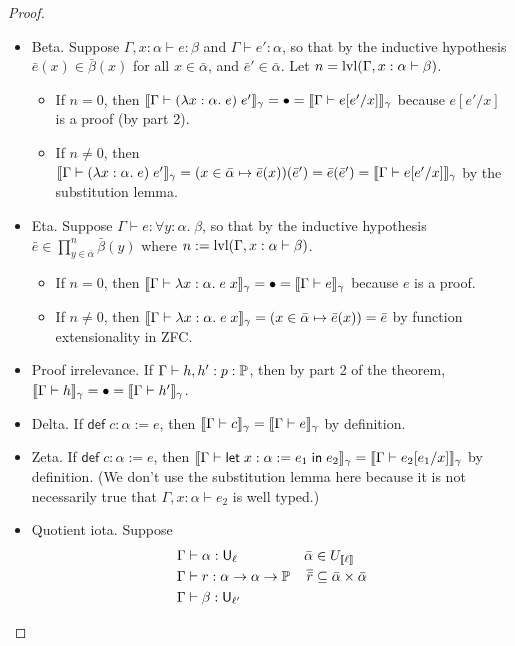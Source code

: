 \begin{proof}
\begin{itemize}
\item Beta. Suppose $\Gamma,x:\alpha\vdash e:\beta$ and $\Gamma\vdash e':\alpha$, so that by the inductive hypothesis $\bar e(x)\in\bar\beta(x)$ for all $x\in\bar\alpha$, and $\bar e'\in\bar\alpha$. Let $n=\lvl(\Gamma,x:\alpha\vdash\beta)$.
\begin{itemize}
\item If $n=0$, then $\scott{\Gamma\vdash(\lambda x:\alpha.\;e)\;e'}_\gamma=\bullet=\scott{\Gamma\vdash e[e'/x]}_\gamma$ because $e[e'/x]$ is a proof (by part 2).
\item If $n\ne 0$, then $\scott{\Gamma\vdash(\lambda x:\alpha.\;e)\;e'}_\gamma=(x\in\bar\alpha\mapsto\bar e(x))(\bar e')=\bar e(\bar e')=\scott{\Gamma\vdash e[e'/x]}_\gamma$ by the substitution lemma.
\end{itemize}
\item Eta. Suppose $\Gamma\vdash e:\forall y:\alpha.\;\beta$, so that by the inductive hypothesis $\bar e\in\prod^n_{y\in\bar\alpha}\bar\beta(y)$ where $n:=\lvl(\Gamma,x:\alpha\vdash\beta)$.
\begin{itemize}
\item If $n=0$, then $\scott{\Gamma\vdash \lambda x:\alpha.\;e\;x}_\gamma=\bullet=\scott{\Gamma\vdash e}_\gamma$ because $e$ is a proof.
\item If $n\ne 0$, then $\scott{\Gamma\vdash \lambda x:\alpha.\;e\;x}_\gamma=(x\in\bar\alpha\mapsto\bar e(x))=\bar e$ by function extensionality in ZFC.
\end{itemize}
\item Proof irrelevance. If $\Gamma\vdash h,h':p:\P$, then by part 2 of the theorem, $\scott{\Gamma\vdash h}_\gamma=\bullet=\scott{\Gamma\vdash h'}_\gamma$.
\item Delta. If $\mathsf{def}\;c:\alpha:=e$, then $\scott{\Gamma\vdash c}_\gamma=\scott{\Gamma\vdash e}_\gamma$ by definition.
\item Zeta. If $\mathsf{def}\;c:\alpha:=e$, then $\scott{\Gamma\vdash\elet{x:\alpha:=e_1}{e_2}}_\gamma=\scott{\Gamma\vdash e_2[e_1/x]}_\gamma$ by definition. (We don't use the substitution lemma here because it is not necessarily true that $\Gamma,x:\alpha\vdash e_2$ is well typed.)
\item Quotient iota. Suppose
\begin{align*}
\Gamma&\vdash\alpha:\U_\ell&
\bar\alpha&\in U_{\scott{\ell}}\\
\Gamma&\vdash r:\alpha\to\alpha\to\P&
\overline{\bar r}&\subseteq\bar\alpha\times\bar\alpha\\
\Gamma&\vdash \beta:\U_{\ell'}&

\end{align*}
\end{itemize}
\end{proof}
